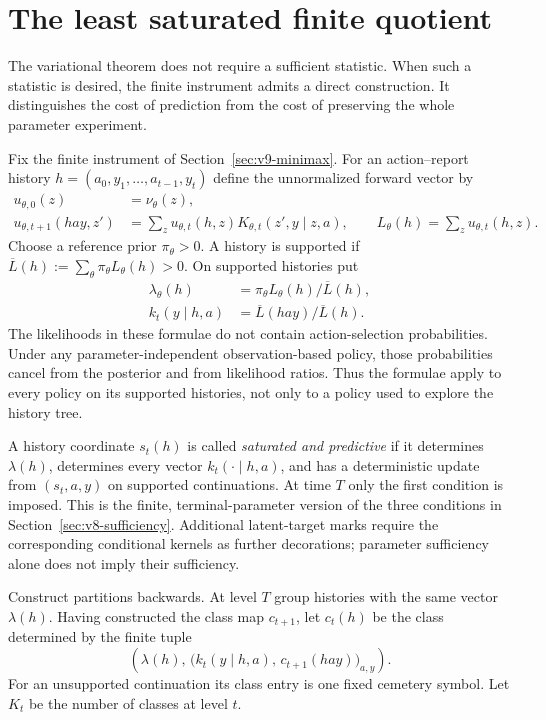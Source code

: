 \section{The least saturated finite quotient}
\label{sec:v9-saturation}
The variational theorem does not require a sufficient statistic. When
such a statistic is desired, the finite instrument admits a direct
construction. It distinguishes the cost of prediction from the cost of
preserving the whole parameter experiment.

Fix the finite instrument of Section~\ref{sec:v9-minimax}. For an
action--report history $h=(a_0,y_1,\ldots,a_{t-1},y_t)$ define the
unnormalized forward vector by
\begin{align}
 u_{\theta,0}(z)&=\nu_\theta(z),\nonumber\\
 u_{\theta,t+1}(hay,z')
   &=\sum_z u_{\theta,t}(h,z)K_{\theta,t}(z',y\mid z,a),
   \qquad L_\theta(h)=\sum_z u_{\theta,t}(h,z).
 \label{eq:v9-forward}
\end{align}
Choose a reference prior $\pi_\theta>0$. A history is supported if
$\overline L(h):=\sum_\theta\pi_\theta L_\theta(h)>0$. On supported
histories put
\begin{align}
 \lambda_\theta(h)&=\pi_\theta L_\theta(h)/\overline L(h),\nonumber\\
 k_t(y\mid h,a)&=\overline L(hay)/\overline L(h).
 \label{eq:v9-finitepredict}
\end{align}
The likelihoods in these formulae do not contain action-selection
probabilities. Under any parameter-independent observation-based policy,
those probabilities cancel from the posterior and from likelihood ratios.
Thus the formulae apply to every policy on its supported histories, not
only to a policy used to explore the history tree.

A history coordinate $s_t(h)$ is called \emph{saturated and predictive}
if it determines $\lambda(h)$, determines every vector
$k_t(\cdot\mid h,a)$, and has a deterministic update from $(s_t,a,y)$ on
supported continuations. At time $T$ only the first condition is imposed.
This is the finite, terminal-parameter version of the three conditions
in Section~\ref{sec:v8-sufficiency}. Additional latent-target marks
require the corresponding conditional kernels as further decorations;
parameter sufficiency alone does not imply their sufficiency.

Construct partitions backwards. At level $T$ group histories with the
same vector $\lambda(h)$. Having constructed the class map $c_{t+1}$,
let $c_t(h)$ be the class determined by the finite tuple
\begin{equation}
 \left(\lambda(h),\,
   \big(k_t(y\mid h,a),\,c_{t+1}(hay)\big)_{a,y}\right).
 \label{eq:v9-saturatedkey}
\end{equation}
For an unsupported continuation its class entry is one fixed cemetery
symbol. Let $K_t$ be the number of classes at level $t$.

